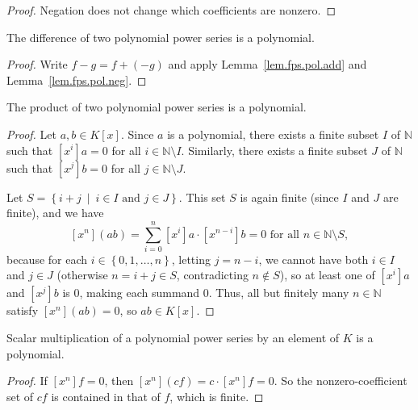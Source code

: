 \begin{proof}
\leanok
Negation does not change which coefficients are nonzero.
\end{proof}

\begin{lemma}
\label{lem.fps.pol.sub}
\leanhelper
\leanok
The difference of two polynomial power series is a polynomial.
\end{lemma}

\begin{proof}
\leanok
Write $f-g=f+(-g)$ and apply Lemma~\ref{lem.fps.pol.add} and
Lemma~\ref{lem.fps.pol.neg}.
\end{proof}

\begin{lemma}
\label{lem.fps.pol.mul}
\leanhelper
\leanok
The product of two polynomial power series is a polynomial.
\end{lemma}

\begin{proof}
\leanok
Let $a,b\in K\left[  x\right]  $. Since $a$ is a polynomial, there exists a finite
subset $I$ of $\mathbb{N}$ such that
$\left[  x^{i}\right]  a=0$ for all
$i\in\mathbb{N}\setminus I$.
Similarly, there exists a finite subset $J$ of
$\mathbb{N}$ such that
$\left[  x^{j}\right]  b=0$ for all
$j\in\mathbb{N}\setminus J$.

Let $S=\left\{
i+j\ \mid\ i\in I\text{ and }j\in J\right\}$. This set $S$
is again finite (since $I$ and $J$ are finite), and we have
\[
\left[  x^{n}\right]  \left(  ab\right)  =\sum_{i=0}^{n}\left[  x^{i}\right]
a\cdot\left[  x^{n-i}\right]  b=0\text{ for all }n\in\mathbb{N}\setminus S,
\]
because for each $i\in\left\{  0,1,\ldots,n\right\}$, letting $j=n-i$, we cannot have both
$i\in I$ and $j\in J$ (otherwise $n=i+j\in S$, contradicting
$n\notin S$), so at least one of $\left[  x^{i}\right]  a$ and
$\left[  x^{j}\right]  b$ is $0$, making each summand $0$.
Thus, all but finitely many
$n\in\mathbb{N}$ satisfy $\left[  x^{n}\right]  \left(  ab\right)  =0$, so $ab\in K\left[  x\right]  $.
\end{proof}

\begin{lemma}
\label{lem.fps.pol.smul}
\leanhelper
\leanok
Scalar multiplication of a polynomial power series by an element of $K$ is a
polynomial.
\end{lemma}

\begin{proof}
\leanok
If $\left[x^{n}\right]f=0$, then $\left[x^{n}\right](cf)=c\cdot
\left[x^{n}\right]f=0$. So the nonzero-coefficient set of $cf$ is contained
in that of $f$, which is finite.
\end{proof}

